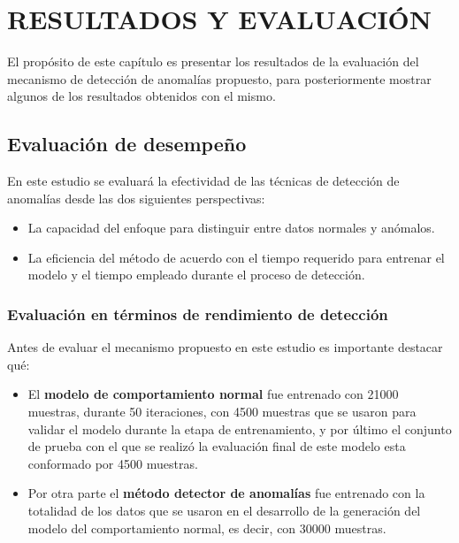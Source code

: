 \chapter{\uppercase{Resultados y evaluaci\'{o}n}}
\label{Capitulo 6}

El prop\'{o}sito de este cap\'{i}tulo es presentar los resultados de la evaluaci\'{o}n del mecanismo de detecci\'{o}n de anomal\'{i}as propuesto, para posteriormente mostrar algunos de los resultados obtenidos con el mismo.

\section{Evaluaci\'{o}n de desempe\~{n}o}

En este estudio se evaluar\'{a} la efectividad de las t\'{e}cnicas de detecci\'{o}n de anomal\'{i}as desde las dos siguientes perspectivas:
\begin{itemize}
\item La capacidad del enfoque para distinguir entre datos normales y an\'{o}malos.
\item La eficiencia del m\'{e}todo de acuerdo con el tiempo requerido para entrenar el modelo y el tiempo empleado durante el proceso de detecci\'{o}n.

\end{itemize}

\subsection{Evaluación en términos de rendimiento de detección}

Antes de evaluar el mecanismo propuesto en este estudio es importante destacar qu\'{e}:

\begin{itemize}
\item El \textbf{modelo de comportamiento normal} fue entrenado con 21000 muestras, durante 50 iteraciones, con 4500 muestras que se usaron para validar el modelo durante la etapa de entrenamiento, y por \'{u}ltimo el conjunto de prueba con el que se realiz\'{o} la evaluaci\'{o}n final de este modelo esta conformado por 4500 muestras.
\item Por otra parte el \textbf{m\'{e}todo detector de anomal\'{i}as} fue entrenado con la totalidad de los datos que se usaron en el desarrollo de la generaci\'{o}n del modelo del comportamiento normal, es decir, con 30000 muestras.
\end{itemize}

